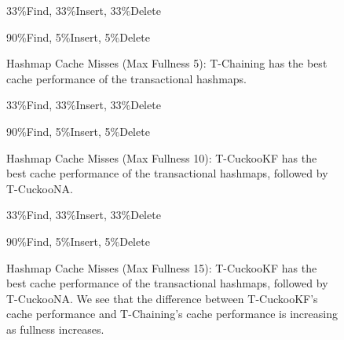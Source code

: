     \begin{figure}[H]
    \centering
        \begin{minipage}{0.75\textwidth}
        \centering
            \caption*{33\%Find, 33\%Insert, 33\%Delete}
            \vspace{12pt}
        \end{minipage}
        \begin{minipage}{0.75\textwidth}
            \centering
            \caption*{90\%Find, 5\%Insert, 5\%Delete}
        \end{minipage}
        \caption[Hashmap Cache Misses (Max Fullness 5)]{Hashmap Cache Misses (Max Fullness 5): T-Chaining has the best cache performance of the transactional hashmaps.}
		\label{fig:hm_cm5}
    \end{figure}

    \begin{figure}[H]
    \centering
        \begin{minipage}{0.75\textwidth}
        \centering
            \caption*{33\%Find, 33\%Insert, 33\%Delete}
            \vspace{12pt}
        \end{minipage}
        \begin{minipage}{0.75\textwidth}
            \centering
            \caption*{90\%Find, 5\%Insert, 5\%Delete}
        \end{minipage}
        \caption[Hashmap Cache Misses (Max Fullness 10)]{Hashmap Cache Misses (Max Fullness 10): T-CuckooKF has the best cache performance of the transactional hashmaps, followed by T-CuckooNA.}
		\label{fig:hm_cm10}
    \end{figure}

    \begin{figure}[H]
    \centering
        \begin{minipage}{0.75\textwidth}
        \centering
            \caption*{33\%Find, 33\%Insert, 33\%Delete}
            \vspace{12pt}
        \end{minipage}
        \begin{minipage}{0.75\textwidth}
            \centering
            \caption*{90\%Find, 5\%Insert, 5\%Delete}
        \end{minipage}
        \caption[Hashmap Cache Misses (Max Fullness 15)]{Hashmap Cache Misses (Max Fullness 15): T-CuckooKF has the best cache performance of the transactional hashmaps, followed by T-CuckooNA. We see that the difference between T-CuckooKF's cache performance and T-Chaining's cache performance is increasing as fullness increases.}
		\label{fig:hm_cm15}
    \end{figure}

